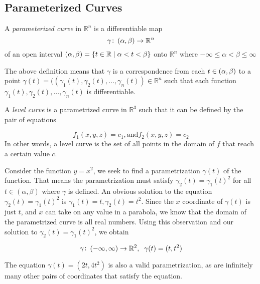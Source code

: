 \subsection{Parameterized Curves}


\begin{definition}
		A \textit{parameterized curve} in \(\mathbb{R}^{n}\) is a differentiable map
            \[
\gamma \colon \intoo{\alpha, \beta} \rightarrow \mathbb{R}^{n}
\]
		of an open interval \(\intoo{\alpha, \beta} = \{t \in \mathbb{R} \mid \alpha < t < \beta \}\) onto \(\mathbb{R}^{n}\) where \(-\infty \leq \alpha < \beta \leq \infty\)

\end{definition}

	The above definition means that \(\gamma\) is a correspondence from each \(t \in \intoo{\alpha, \beta}\) to a point \(\gamma(t) = ((\gamma_{1}(t), \gamma_{2}(t), \ldots, \gamma_{n}(t)) \in \mathbb{R}^{n}\) such that each function \(\gamma_{1}(t), \gamma_{2}(t), \ldots, \gamma_{n}(t)\) is differentiable.


\begin{definition}
		A \textit{level curve} is a parametrized curve in \(\mathbb{R}^{3}\) such that it can be defined by the pair of equations

\[
f_{1}(x, y, z) = c_{1}, \text{and} f_{2}(x, y, z) = c_{2}
\]
		In other words, a level curve is the set of all points in the domain of \(f\) that reach a certain value \(c\).

\end{definition}


\begin{example}
		Consider the function \(y = x^{2}\), we seek to find a parametrization \(\gamma(t)\) of the function. That means the parametrization must satisfy \(\gamma_{2}(t) = \gamma_{1}(t)^{2}\) for all \(t \in (\alpha, \beta)\) where \(\gamma\) is defined.
		An obvious solution to the equation \(\gamma_{2}(t) = \gamma_{1}(t)^{2}\) is \(\gamma_{1}(t) = t, \gamma_{2}(t) = t^{2}\). Since the \(x\) coordinate of \(\gamma(t)\) is just \(t\), and \(x\) can take on any value in a parabola, we know that the domain of the parametrized curve is all real numbers. Using this observation and our solution to \(\gamma_{2}(t) = \gamma_{1}(t)^{2}\), we obtain

\[
\gamma \colon \intoo{-\infty, \infty} \rightarrow \mathbb{R}^{2}, \;\; \gamma(t) = (t,t^{2})
\]

\begin{remark}
			The equation \(\gamma(t) = (2t, 4t^{2})\) is also a valid parametrization, as are infinitely many other pairs of coordinates that satisfy the equation.

\end{remark}

\end{example}


